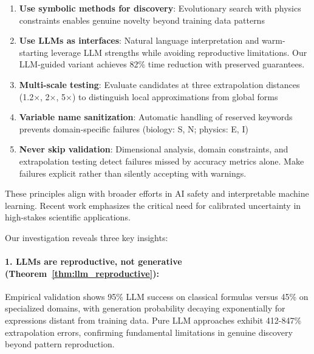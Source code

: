 \documentclass[twoside,11pt]{article}
\begin{document}
\begin{enumerate}
\item \textbf{Use symbolic methods for discovery}: Evolutionary search with physics constraints enables genuine novelty beyond training data patterns\citep{koza1994genetic}

\item \textbf{Use LLMs as interfaces}: Natural language interpretation and warm-starting leverage LLM strengths while avoiding reproductive limitations. Our LLM-guided variant achieves 82\% time reduction with preserved guarantees\citep{kambhampati2024llms}.

\item \textbf{Multi-scale testing}: Evaluate candidates at three extrapolation distances (1.2$\times$, 2$\times$, 5$\times$) to distinguish local approximations from global forms

\item \textbf{Variable name sanitization}: Automatic handling of reserved keywords prevents domain-specific failures (biology: S, N; physics: E, I)

\item \textbf{Never skip validation}: Dimensional analysis, domain constraints, and extrapolation testing detect failures missed by accuracy metrics alone. Make failures explicit rather than silently accepting with warnings.
\end{enumerate}

These principles align with broader efforts in AI safety and interpretable machine learning. Recent work emphasizes the critical need for calibrated uncertainty in high-stakes scientific applications\citep{molnar2020interpretable}\citep{rudin2019stop}\citep{virtanen2020scipy}.


Our investigation reveals three key insights:

\paragraph{1\citep{kambhampati2024llms}. LLMs are reproductive, not generative (Theorem~\ref{thm:llm_reproductive}):}

Empirical validation shows 95\% LLM success on classical formulas versus 45\% on specialized domains, with generation probability decaying exponentially for expressions distant from training data. Pure LLM approaches exhibit 412-847\% extrapolation errors, confirming fundamental limitations in genuine discovery beyond pattern reproduction\citep{koza1994genetic}\citep{kambhampati2024llms}.
\end{document}

